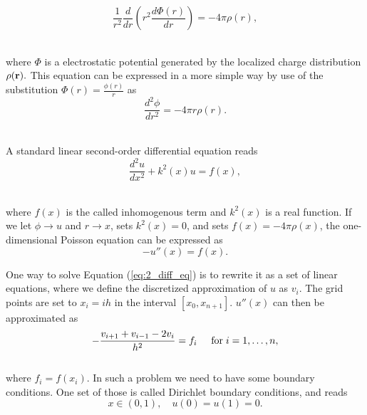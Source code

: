 \documentclass[12pt]{article}
\begin{document}
\begin{flushleft}
$$\frac{1}{r^2}\frac{d}{dr}\left(r^2\frac{d\Phi(r)}{dr}\right) = -4\pi \rho(r),$$\\
\vspace{5mm}

where $\Phi$ is a electrostatic potential generated by the localized charge distribution $\rho(\bf r).$ This equation can be expressed in a more simple way by use of the substitution $\Phi(r) = \frac{\phi(r)}{r}$ as\\

$$\frac{d^2\phi}{dr^2}= -4\pi r\rho(r).$$\\
\vspace{5mm}

A standard linear second-order differential equation reads\\

$$\frac{d^2u}{dx^2}+k^2(x)u = f(x),$$\\
\vspace{5mm}

where $f(x)$ is the called inhomogenous term and $k^{2}(x)$ is a real function. If we let $\phi \rightarrow u$ and $r\rightarrow x$, sets $k^{2}(x) = 0$,  and sets $f(x) = -4\pi\rho(x)$, the one-dimensional Poisson equation can be expressed as\\

\begin{equation}\label{eq:2_diff_eq}
-u''(x) = f(x).
\end{equation}
\vspace{5mm}

One way to solve Equation (\ref{eq:2_diff_eq}) is to rewrite it as a set of linear equations, where we define the discretized approximation of $u$ as $v_{i}$. The grid points are set to $x_{i} = ih$ in the interval $[x_{0},x_{n+1}]$. $u''(x)$ can then be approximated as\\

\begin{equation}\label{eq:double_derivative}
-\frac{v_{i+1}+v_{i-1}-2v_i}{h^2} = f_i  \hspace{0.5cm} \mathrm{for} \hspace{0.1cm} i=1,\dots, n,
\end{equation}\\
\vspace{5mm}
where $f_i=f(x_i)$. In such a problem we need to have some boundary conditions. One set of those is called Dirichlet boundary conditions, and reads\\

\begin{equation}\label{eq:boundary}
x\in (0,1),\quad u(0) = u(1) = 0.
\end{equation}
 


\end{flushleft}
\end{document}
